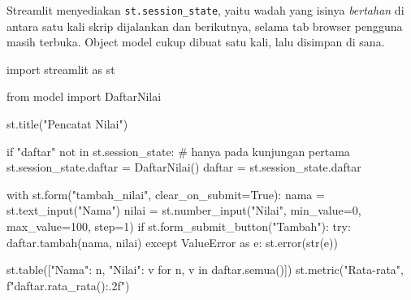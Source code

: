 Streamlit menyediakan \texttt{st.session\_state}, yaitu wadah yang isinya \emph{bertahan} di antara satu kali skrip dijalankan dan berikutnya, selama tab browser pengguna masih terbuka. Object model cukup dibuat satu kali, lalu disimpan di sana.

\begin{kode}
import streamlit as st

from model import DaftarNilai

st.title("Pencatat Nilai")

if "daftar" not in st.session_state:         # hanya pada kunjungan pertama
    st.session_state.daftar = DaftarNilai()
daftar = st.session_state.daftar

with st.form("tambah_nilai", clear_on_submit=True):
    nama = st.text_input("Nama")
    nilai = st.number_input("Nilai", min_value=0, max_value=100, step=1)
    if st.form_submit_button("Tambah"):
        try:
            daftar.tambah(nama, nilai)
        except ValueError as e:
            st.error(str(e))

st.table([{"Nama": n, "Nilai": v} for n, v in daftar.semua()])
st.metric("Rata-rata", f"{daftar.rata_rata():.2f}")
\end{kode}

